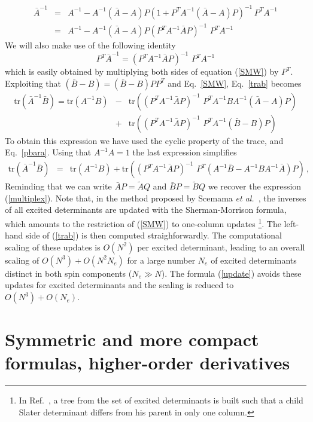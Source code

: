 \documentclass[aip,jcp,reprint,floatfix,onecolumn]{revtex4-1}
\def\tr{\text{tr}}
\begin{document}
\begin{eqnarray}
\bar{A}^{-1} & =& A^{-1} -A^{-1} (\bar{A}-A)P (1+ P^T A^{-1} (\bar{A}-A)P)^{-1} \, P^T A^{-1} \nonumber \\
 & =&  A^{-1}-A^{-1} (\bar{A}-A)P (P^T A^{-1} \bar{A}P)^{-1} \, \, P^T A^{-1}
\label{SMW}
\end{eqnarray}
We will also make use of the following identity
\begin{equation}
P^T \bar{A}^{-1} = (P^T A^{-1} \bar{A}P)^{-1} \, \, P^T A^{-1}
\label{pbara}
\end{equation}
which is easily obtained by multiplying  both sides of equation (\ref{SMW}) by $P^T$.
Exploiting that  $(\bar{B}-B) = (\bar{B}-B)P P^T$ and  Eq.~\ref{SMW}, Eq.~\ref{trab} becomes
\begin{eqnarray}
\tr (\bar{A}^{-1}\bar{B}) = \tr (A^{-1} B) &-& \tr ( (P^T A^{-1} \bar{A}P)^{-1}
\, \, P^T A^{-1}B A^{-1} (\bar{A}-A)P) \nonumber \\
& + & \tr ( (P^T A^{-1} \bar{A}P)^{-1} \, \, P^T A^{-1}(\bar{B}-B)P)
\nonumber
\end{eqnarray}
To obtain this expression we have used the cyclic property of the trace, and Eq.~\ref{pbara}.
Using that $A^{-1}A = 1$ the last expression simplifies
\begin{eqnarray}
\tr (\bar{A}^{-1}\bar{B})
& = &  \tr ( A^{-1}B) + \tr
((P^T A^{-1} \bar{A}P)^{-1}\, \,  P^T (A^{-1}\bar{B}-A^{-1}BA^{-1} \bar{A})P)\,,
\label{update}
\end{eqnarray}
Reminding that we can write $\bar{A}P=\tilde{A}Q$ and $\bar{B}P=\tilde{B}Q$ we recover the expression (\ref{multiplex}).
Note that, in the method proposed by Scemama {\sl et al.}~\cite{Scemama15}, the inverses of all excited determinants are  updated
with the Sherman-Morrison formula, which amounts to the restriction of (\ref{SMW}) to one-column updates \footnote{In Ref.~,
a tree from the set of excited determinants is built such that a child Slater determinant differs from his parent in only one column.}. The left-hand
side of  (\ref{trab}) is then computed straighforwardly.  The computational scaling of these updates is $O(N^2)$ per excited determinant, leading
to an overall scaling of $O(N^3) + O(N^2 N_e)$ for a large number $N_e$  of excited determinants distinct in both spin components ($N_e \gg N$).
The formula  (\ref{update})   avoids  these updates for excited determinants  and  the scaling is reduced to  $O(N^3)+ O(N_e)$.

\section{Symmetric and more compact formulas, higher-order derivatives}
\label{App_not}
\end{document}
